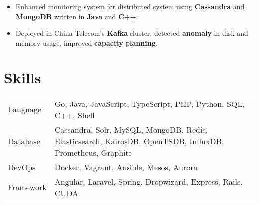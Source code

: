 \documentclass[11pt, letterpaper]{simple-cv}
\begin{document}

\begin{itemize}
  \item Enhanced monitoring system for distributed system using \textbf{Cassandra} and \textbf{MongoDB} written in \textbf{Java} and \textbf{C++}.
  \item Deployed in China Telecom's \textbf{Kafka} cluster, detected \textbf{anomaly} in disk and memory usage, improved \textbf{capacity planning}.
\end{itemize}


\section{Skills}
\begin{tabular}{ l l }
 Language &  Go, Java, JavaScript, TypeScript, PHP, Python, SQL, C++, Shell\\
 Database & Cassandra, Solr, MySQL, MongoDB, Redis, Elasticsearch, KairosDB, OpenTSDB, InfluxDB, Prometheus, Graphite\\
 DevOps & Docker, Vagrant, Ansible, Mesos, Aurora\\
 Framework & Angular, Laravel, Spring, Dropwizard, Express, Rails, CUDA
\end{tabular}
\end{document}
